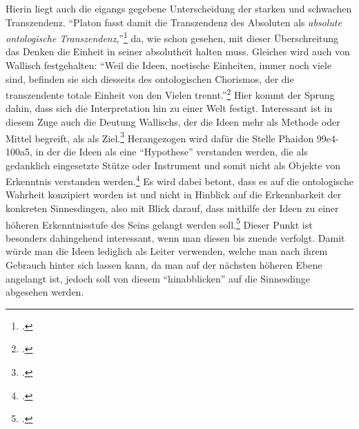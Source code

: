 Hierin liegt auch die eigangs gegebene Unterscheidung der starken und schwachen Transzendenz.
\enquote{Platon fasst damit die Transzendenz des Absoluten als \emph{absolute ontologische Transzendenz},}\footcite[][S. 224]{halfwassenaufstieg2006} da, wie schon gesehen, mit dieser Überschreitung das Denken die Einheit in seiner absolutheit halten muss. Gleiches wird auch von Wallisch festgehalten: \enquote{Weil die Ideen, noetische Einheiten, immer noch viele sind, befinden sie sich diesseits des ontologischen Chorismos, der die transzendente totale Einheit von den Vielen trennt.}\footcite[][S. 17]{Wallisch}
Hier kommt der Sprung dahin, dass sich die Interpretation hin zu einer Welt festigt. 
Interessant ist in diesem Zuge auch die Deutung Wallischs, der
die Ideen mehr als Methode oder Mittel begreift, als als Ziel.\footcite[vgl.][S. 26]{Wallisch} Herangezogen wird dafür die Stelle Phaidon 99e4-100a5, in der die Ideen als eine \enquote{Hypothese} verstanden werden, die als gedanklich eingesetzte Stütze oder Instrument und somit nicht als Objekte von Erkenntnis verstanden werden.\footcite[vgl.][S. 26]{Wallisch} Es wird dabei betont, dass es auf die ontologische Wahrheit konzipiert worden ist und nicht in Hinblick auf die Erkennbarkeit der konkreten Sinnesdingen, also mit Blick darauf, dass mithilfe der Ideen zu einer höheren Erkenntnisstufe des Seins gelangt werden soll.\footcite[vgl.][S. 27]{Wallisch}
Dieser Punkt ist besonders dahingehend interessant, wenn man diesen bis zuende verfolgt. Damit würde man die Ideen lediglich als Leiter verwenden, welche man nach ihrem Gebrauch hinter sich lassen kann, da man auf der nächsten höheren Ebene angelangt ist, jedoch soll von diesem \enquote{hinabblicken} auf die Sinnesdinge abgesehen werden. 
